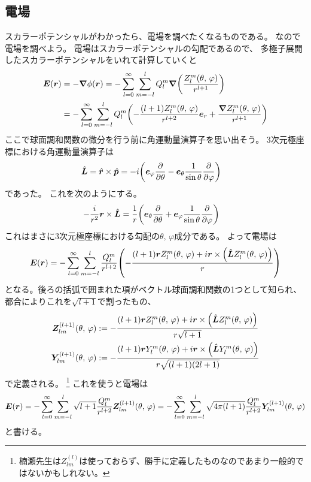 \documentclass[../../master.tex]{subfiles}
\begin{document}
\subsection{電場}
スカラーポテンシャルがわかったら、電場を調べたくなるものである。
なので電場を調べよう。
電場はスカラーポテンシャルの勾配であるので、
多極子展開したスカラーポテンシャルをいれて計算していくと
\begin{align}
    \vb*{E}(\vb*{r}) &= -\grad \phi(\vb*{r})
    = -\sum_{l=0}^{\infty} \sum_{m=-l}^{l} Q_l^m \grad\qty(\frac{Z_l^m(\theta,\,\varphi)}{r^{l+1}})\\
    &= -\sum_{l=0}^{\infty} \sum_{m=-l}^{l} Q_l^m \qty(-\frac{(l+1)Z_l^m(\theta,\,\varphi)}{r^{l+2}}\vb*{e}_r+\frac{\grad Z_l^m(\theta,\,\varphi)}{r^{l+1}})\\
\end{align}
ここで球面調和関数の微分を行う前に角運動量演算子を思い出そう。
3次元極座標における角運動量演算子は
\begin{align}
    \hat{\vb*{L}} &= \hat{\vb*{r}} \times \hat{\vb*{p}}
    = -i\qty(\vb*{e}_\varphi \pdv{\theta} -\vb*{e}_\theta \frac{1}{\sin\theta}\pdv{\varphi})
\end{align}
であった。
これを次のようにする。
\begin{align}
    -\frac{i}{r^2}\vb*{r} \times \hat{\vb*{L}} &= \frac{1}{r}\qty(\vb*{e}_\theta \pdv{\theta} +\vb*{e}_\varphi \frac{1}{\sin\theta}\pdv{\varphi})
\end{align}
これはまさに3次元極座標における勾配の\(\theta,\,\varphi\)成分である。
よって電場は
\begin{equation}
    \vb*{E}(\vb*{r}) = -\sum_{l=0}^{\infty} \sum_{m=-l}^{l}\frac{Q_l^m}{r^{l+2}}
    \qty(-\frac{(l+1)\vb*{r}Z_l^m(\theta,\,\varphi)+i\vb*{r}\times\qty(\hat{\vb*{L}}Z_l^m(\theta,\,\varphi))}{r})
\end{equation}
となる。後ろの括弧で囲まれた項がベクトル球面調和関数の1つとして知られ、
都合によりこれを\(\sqrt{l+1}\)で割ったもの、
\begin{align}
    \vb*{Z}_{lm}^{(l+1)}(\theta,\,\varphi) &:=-\frac{(l+1)\vb*{r}Z_l^m(\theta,\,\varphi)+i\vb*{r}\times\qty(\hat{\vb*{L}}Z_l^m(\theta,\,\varphi))}{r\sqrt{l+1}}\\
    \vb*{Y}_{lm}^{(l+1)}(\theta,\,\varphi) &:=-\frac{(l+1)\vb*{r}Y_l^m(\theta,\,\varphi)+i\vb*{r}\times\qty(\hat{\vb*{L}}Y_l^m(\theta,\,\varphi))}{r\sqrt{(l+1)(2l+1)}}\\
\end{align}
で定義される。
\footnote{楠瀬先生は\(Z_{lm}^{(l)}\)は使っておらず、勝手に定義したものなのであまり一般的ではないかもしれない。}
これを使うと電場は
\begin{align}
    \vb*{E}(\vb*{r})
    = -\sum_{l=0}^{\infty} \sum_{m=-l}^{l}\sqrt{l+1}\frac{Q_l^m}{r^{l+2}} \vb*{Z}_{lm}^{(l+1)}(\theta,\,\varphi)
    = -\sum_{l=0}^{\infty} \sum_{m=-l}^{l}\sqrt{4\pi(l+1)}\frac{Q_l^m}{r^{l+2}} \vb*{Y}_{lm}^{(l+1)}(\theta,\,\varphi)\\
\end{align}
と書ける。
\end{document}
